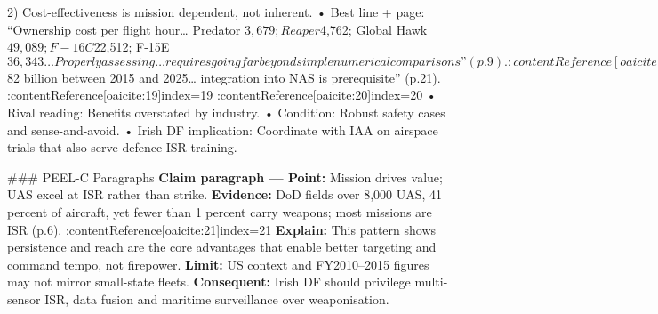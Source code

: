 2) Cost-effectiveness is mission dependent, not inherent.  
• Best line + page: “Ownership cost per flight hour… Predator $3,679; Reaper $4,762; Global Hawk $49,089; F-16C $22,512; F-15E $36,343… Properly assessing… requires going far beyond simple numerical comparisons” (p.9). :contentReference[oaicite:16]{index=16}  
• Rival reading: UAS are always cheaper.  
• Condition: When full ownership costs and mission effects are measured.  
• Irish DF implication: Run mission-based costing for ISR vs patrol aircraft before procurement.

3) Strategic risks: sovereignty, slippery slope, blowback, war powers erosion, proliferation.  
• Best line + page: “These risks include the potential erosion of sovereignty… slippery slope… blowback… war powers… proliferation to non-state actors” (p.10). :contentReference[oaicite:17]{index=17}  
• Rival reading: Risks are marginal with precision and oversight.  
• Condition: Outside declared war zones; weak transparency.  
• Irish DF implication: Codify consent, review, and transparency before any kinetic UAS use.

4) First-mover gains fade; regulation and exports shape advantage.  
• Best line + page: “United States must harness commercial development… low barriers to entry… software improvements will drive advances” (pp.22–23). :contentReference[oaicite:18]{index=18}  
• Rival reading: US technical edge is locked in.  
• Condition: If FAA integration lags and export rules over-restrict.  
• Irish DF implication: Align with EU and ICAO standards; exploit commercial market to cut costs.

5) Civil UAS could deliver large economic gains if integrated.  
• Best line + page: “Economic impact… about $82 billion between 2015 and 2025… integration into NAS is prerequisite” (p.21). :contentReference[oaicite:19]{index=19} :contentReference[oaicite:20]{index=20}  
• Rival reading: Benefits overstated by industry.  
• Condition: Robust safety cases and sense-and-avoid.  
• Irish DF implication: Coordinate with IAA on airspace trials that also serve defence ISR training.


### PEEL-C Paragraphs
\textbf{Claim paragraph — Point:} Mission drives value; UAS excel at ISR rather than strike.  
\textbf{Evidence:} DoD fields over 8,000 UAS, 41 percent of aircraft, yet fewer than 1 percent carry weapons; most missions are ISR (p.6). :contentReference[oaicite:21]{index=21}  
\textbf{Explain:} This pattern shows persistence and reach are the core advantages that enable better targeting and command tempo, not firepower.  
\textbf{Limit:} US context and FY2010–2015 figures may not mirror small-state fleets.  
\textbf{Consequent:} Irish DF should privilege multi-sensor ISR, data fusion and maritime surveillance over weaponisation.

